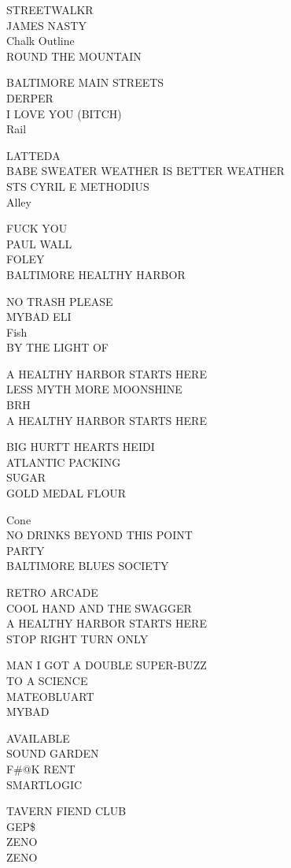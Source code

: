 \documentclass[10pt,letterpaper]{article}
\begin{document}
STREETWALKR\\
JAMES NASTY\\
Chalk Outline\\
ROUND THE MOUNTAIN

BALTIMORE MAIN STREETS\\
DERPER\\
I LOVE YOU (BITCH)\\
Rail

LATTEDA\\
BABE SWEATER WEATHER IS BETTER WEATHER\\
STS CYRIL E METHODIUS\\
Alley

FUCK YOU\\
PAUL WALL\\
FOLEY\\
BALTIMORE HEALTHY HARBOR

NO TRASH PLEASE\\
MYBAD ELI\\
Fish\\
BY THE LIGHT OF

A HEALTHY HARBOR STARTS HERE\\
LESS MYTH MORE MOONSHINE\\
BRH\\
A HEALTHY HARBOR STARTS HERE

BIG HURTT HEARTS HEIDI\\
ATLANTIC PACKING\\
SUGAR\\
GOLD MEDAL FLOUR

Cone\\
NO DRINKS BEYOND THIS POINT\\
PARTY\\
BALTIMORE BLUES SOCIETY

RETRO ARCADE\\
COOL HAND AND THE SWAGGER\\
A HEALTHY HARBOR STARTS HERE\\
STOP RIGHT TURN ONLY

MAN I GOT A DOUBLE SUPER{-}BUZZ\\
TO A SCIENCE\\
MATEOBLUART\\
MYBAD

AVAILABLE\\
SOUND GARDEN\\
F\#@K RENT\\
SMARTLOGIC

TAVERN FIEND CLUB\\
GEP\$\\
ZENO\\
ZENO
\end{document}
